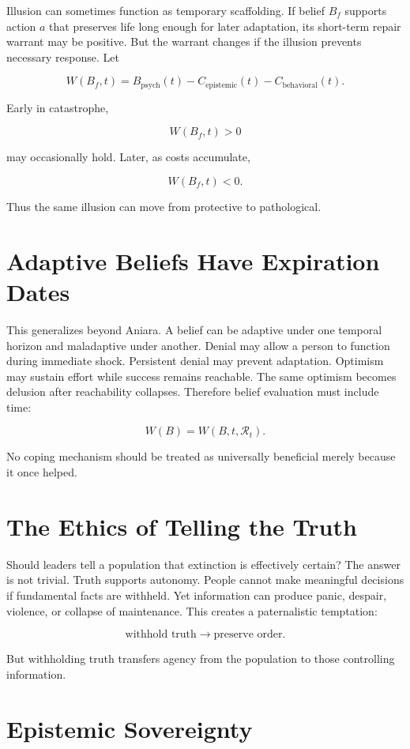 \documentclass[11pt,oneside]{book}
\theoremstyle{definition}
\theoremstyle{remark}
\newcommand{\R}{\mathcal{R}}
\begin{document}
Illusion can sometimes function as temporary scaffolding. If belief \(B_f\) supports action \(a\)
that preserves life long enough for later adaptation, its short-term repair warrant may be positive.
But the warrant changes if the illusion prevents necessary response. Let

\[
W(B_f,t) = B_{\mathrm{psych}}(t) - C_{\mathrm{epistemic}}(t) - C_{\mathrm{behavioral}}(t).
\]

Early in catastrophe,

\[
W(B_f,t)>0
\]

may occasionally hold. Later, as costs accumulate,

\[
W(B_f,t)<0.
\]

Thus the same illusion can move from protective to pathological.

\section{Adaptive Beliefs Have Expiration Dates}

This generalizes beyond Aniara. A belief can be adaptive under one temporal horizon and maladaptive
under another. Denial may allow a person to function during immediate shock. Persistent denial may
prevent adaptation. Optimism may sustain effort while success remains reachable. The same optimism
becomes delusion after reachability collapses. Therefore belief evaluation must include time:

\[
W(B)=W(B,t,\R_t).
\]

No coping mechanism should be treated as universally beneficial merely because it once helped.

\section{The Ethics of Telling the Truth}

Should leaders tell a population that extinction is effectively certain? The answer is not trivial.
Truth supports autonomy. People cannot make meaningful decisions if fundamental facts are withheld.
Yet information can produce panic, despair, violence, or collapse of maintenance. This creates a
paternalistic temptation:

\[
\text{withhold truth} \rightarrow \text{preserve order}.
\]

But withholding truth transfers agency from the population to those controlling information.

\section{Epistemic Sovereignty}
\end{document}
